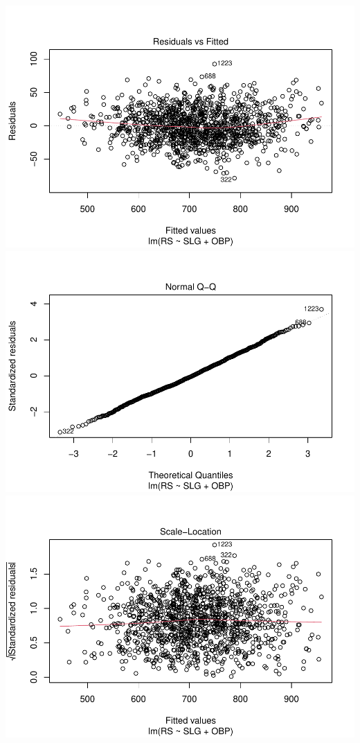 \documentclass[
]{article}
\begin{document}
\includegraphics{HW2_Liu-Zi-Jian_files/figure-latex/unnamed-chunk-41-1.pdf}
\includegraphics{HW2_Liu-Zi-Jian_files/figure-latex/unnamed-chunk-41-2.pdf}
\includegraphics{HW2_Liu-Zi-Jian_files/figure-latex/unnamed-chunk-41-3.pdf}
\end{document}
